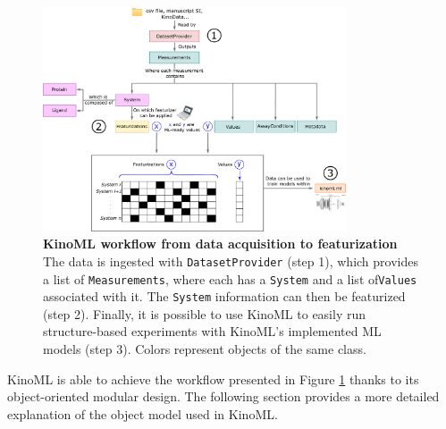 \documentclass[9pt,lessons]{livecoms}
\begin{document}
\begin{figure}[ht]
    \centering
	
    

	\includegraphics[width=0.8\textwidth]{figures/fig_1_kinomltechpaper_v5.pdf}

	

	\caption{\textbf{KinoML workflow from data acquisition to featurization}
    The data is ingested with \texttt{DatasetProvider} (step 1), which provides a list of \texttt{Measurements}, where each has a \texttt{System} and a list of\texttt{Values} associated with it. The \texttt{System} information can then be featurized (step 2). Finally, it is possible to use KinoML to easily run structure-based experiments with KinoML's implemented  ML models (step 3). Colors represent objects of the same class. }
	\label{figure:kinoml-worflow}    
\end{figure}

KinoML is able to achieve the workflow presented in Figure \ref{figure:kinoml-worflow} thanks to its object-oriented modular design. The following section provides a more detailed explanation of the object model used in KinoML.
\end{document}
